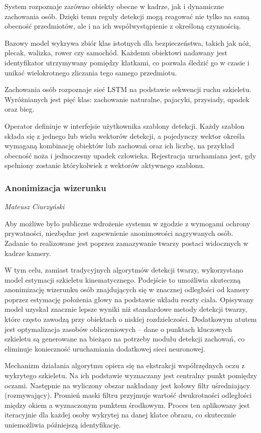 System rozpoznaje zarówno obiekty obecne w kadrze, jak i dynamiczne zachowania osób. Dzięki temu reguły detekcji mogą reagować nie tylko na samą obecność przedmiotów, ale i na ich współwystąpienie z określoną czynnością.

Bazowy model wykrywa zbiór klas istotnych dla bezpieczeństwa, takich jak nóż, plecak, walizka, rower czy samochód. Każdemu obiektowi nadawany jest identyfikator utrzymywany pomiędzy klatkami, co pozwala śledzić go w czasie i unikać wielokrotnego zliczania tego samego przedmiotu.

Zachowania osób rozpoznaje sieć LSTM na podstawie sekwencji ruchu szkieletu. Wyróżnianych jest pięć klas: zachowanie naturalne, pajacyki, przysiady, upadek oraz bieg.

Operator definiuje w interfejsie użytkownika szablony detekcji. Każdy szablon składa się z jednego lub wielu wektorów detekcji, a pojedynczy wektor określa wymaganą kombinację obiektów lub zachowań oraz ich liczbę, na przykład obecność noża i jednoczesny upadek człowieka. Rejestracja uruchamiana jest, gdy spełniony zostanie którykolwiek z wektorów aktywnego szablonu.

\subsubsection{Anonimizacja wizerunku}

\small \textit{Mateusz Ciurzyński}

Aby możliwe było publiczne wdrożenie systemu w zgodzie z wymogami ochrony prywatności, niezbędne jest zapewnienie anonimowości nagrywanych osób. Zadanie to realizowane jest poprzez zamazywanie twarzy postaci widocznych w kadrze kamery.

W tym celu, zamiast tradycyjnych algorytmów detekcji twarzy, wykorzystano model estymacji szkieletu kinematycznego. Podejście to umożliwia skuteczną anonimizację wizerunku osób znajdujących się w znacznej odległości od kamery poprzez estymację położenia głowy na podstawie układu reszty ciała. Opisywany model uzyskał znacznie lepsze wyniki niż standardowe metody detekcji twarzy, które często zawodzą przy obiektach o niskiej rozdzielczości. Dodatkowym atutem jest optymalizacja zasobów obliczeniowych – dane o punktach kluczowych szkieletu są generowane na bieżąco na potrzeby modułu detekcji zachowań, co eliminuje konieczność uruchamiania dodatkowej sieci neuronowej.

Mechanizm działania algorytmu opiera się na ekstrakcji współrzędnych oczu z wykrytego szkieletu. Na ich podstawie wyznaczany jest centralny punkt pomiędzy oczami. Następnie na wyliczony obszar nakładany jest kołowy filtr uśredniający (rozmywający). Promień maski filtru przyjmuje wartość dwukrotności odległości między okiem a wyznaczonym punktem środkowym. Proces ten aplikowany jest iteracyjnie dla każdej osoby wykrytej na danej klatce obrazu, co skutecznie uniemożliwia późniejszą identyfikację.

